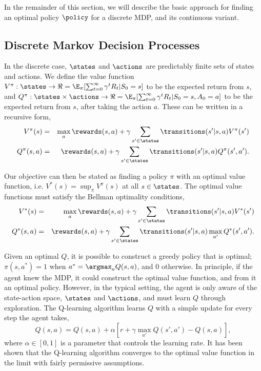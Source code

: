 In the remainder of this section, we will describe the basic approach
for finding an optimal policy $\policy$ for a discrete MDP, and its
continuous variant. 


\subsection{Discrete Markov Decision Processes}
 
In the discrete case, $\states$ and $\actions$ are predictably finite
sets of states and actions. We define the value function $V^{\pi}:
\states \to \Re = \E_{\pi}[\sum_{t=0}^{\infty} \gamma^{t} R_t | S_0
= s ]$ to be the expected return from $s$, and $Q^{\pi}: \states \times
\actions \to \Re = \E_{\pi}[\sum_{t=0}^{\infty} \gamma^{t} R_t | S_0
= s, A_0 = a ]$ to be the expected return from $s$, after taking the
action $a$. These can be written in a recursive form,
\begin{eqnarray*}
  V^{\pi}(s) &=& \max_{a} \rewards(s,a) + \gamma \sum_{s' \in \states} \transitions(s'|s,a) V^{\pi}(s') \\
  Q^{\pi}(s,a) &=& \rewards(s,a) + \gamma \sum_{s' \in \states} \transitions(s'|s,a) Q^{\pi}(s',a').
\end{eqnarray*}

Our objective can then be stated as finding a policy $\pi$ with an
optimal value function, i.e. $V^{*}(s) = \sup_{\pi} V^{\pi}(s)$ at all
$s \in \states$. The optimal value functions must satisfy the Bellman
optimality conditions, 
\begin{eqnarray*}
  V^{*}(s) &=& \max_{a} \rewards(s,a) + \gamma \sum_{s' \in \states} \transitions(s'|s, a) V^{*}(s') \\
  Q^{*}(s,a) &=& \rewards(s,a) + \gamma \sum_{s' \in \states} \transitions(s'|s,a) \max_{a'} Q^{*}(s',a').
\end{eqnarray*}

Given an optimal $Q$, it is possible to construct a greedy policy that
is optimal; $\pi(s,a^*) = 1$ when $a^* = \argmax_{a} Q(s,a)$, and $0$
otherwise. In principle, if the agent knew the MDP, it could construct
the optimal value function, and from it an optimal policy.  However,
in the typical setting, the agent is only aware of the state-action
space, $\states$ and $\actions$, and must learn $Q$ through
exploration. The Q-learning algorithm learns $Q$ with a simple update
for every step the agent takes, $$Q(s,a) = Q(s,a) + \alpha
[ r + \gamma \max_{a'} Q(s',a') - Q(s,a) ],$$ where $\alpha \in [0,1]$
is a parameter that controls the learning rate.  It has been shown
that the Q-learning algorithm converges to the optimal value function
in the limit with fairly permissive assumptions.

